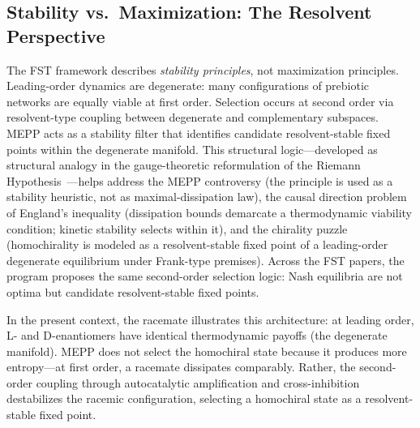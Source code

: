 \documentclass[12pt,a4paper]{article}
\theoremstyle{remark}
\begin{document}
\subsection{Stability vs.\ Maximization: The Resolvent Perspective}

The FST framework describes \emph{stability principles}, not maximization principles. Leading-order dynamics are degenerate: many configurations of prebiotic networks are equally viable at first order. Selection occurs at second order via resolvent-type coupling between degenerate and complementary subspaces. MEPP acts as a stability filter that identifies candidate resolvent-stable fixed points within the degenerate manifold. This structural logic---developed as structural analogy in the gauge-theoretic reformulation of the Riemann Hypothesis~\citep{GeigerRH2026b}---helps address the MEPP controversy (the principle is used as a stability heuristic, not as maximal-dissipation law), the causal direction problem of England's inequality (dissipation bounds demarcate a thermodynamic viability condition; kinetic stability selects within it), and the chirality puzzle (homochirality is modeled as a resolvent-stable fixed point of a leading-order degenerate equilibrium under Frank-type premises). Across the FST papers, the program proposes the same second-order selection logic: Nash equilibria are not optima but candidate resolvent-stable fixed points.

In the present context, the racemate illustrates this architecture: at leading order, L- and D-enantiomers have identical thermodynamic payoffs (the degenerate manifold). MEPP does not select the homochiral state because it produces more entropy---at first order, a racemate dissipates comparably. Rather, the second-order coupling through autocatalytic amplification and cross-inhibition destabilizes the racemic configuration, selecting a homochiral state as a resolvent-stable fixed point.
\end{document}
